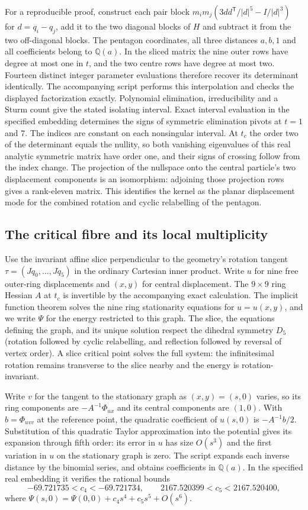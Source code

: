 \documentclass[11pt]{article}
\begin{document}
For a reproducible proof, construct each pair block
$m_im_j(3dd^{\mathsf T}/|d|^5-I/|d|^3)$ for $d=q_i-q_j$, add it to
the two diagonal blocks of $H$ and subtract it from the two off-diagonal
blocks. The pentagon coordinates, all three distances $a,b,1$ and all
coefficients belong to $\mathbb Q(a)$. In the sliced matrix the nine outer
rows have degree at most one in $t$, and the two centre rows have degree
at most two. Fourteen distinct integer parameter evaluations therefore
recover its determinant identically. The accompanying script performs
this interpolation and checks the displayed factorization exactly.
Polynomial elimination, irreducibility and a Sturm count give the stated
isolating interval. Exact interval evaluation in the specified embedding
determines the signs of symmetric elimination pivots at $t=1$ and $7$.
The indices are constant on each nonsingular interval. At $t_c$ the
order two of the determinant equals the nullity, so both vanishing
eigenvalues of this real analytic symmetric matrix have order one,
and their signs of crossing follow from the index change. The projection
of the nullspace onto the central particle's two displacement components
is an isomorphism: adjoining those projection rows gives a rank-eleven
matrix. This identifies the kernel as the planar displacement mode for
the combined rotation and cyclic relabelling of the pentagon.


\subsection{The critical fibre and its local multiplicity}
Use the invariant affine slice perpendicular to the geometry's rotation
tangent $\tau=(Jq_0,\ldots,Jq_5)$ in the ordinary Cartesian inner
product. Write $u$ for nine free outer-ring displacements and $(x,y)$
for central displacement. The $9\times9$ ring Hessian $A$ at $t_c$ is
invertible by the accompanying exact calculation. The implicit function
theorem solves the nine ring stationarity equations for $u=u(x,y)$,
and we write $\Psi$ for the energy restricted to this graph. The slice,
the equations defining the graph, and its unique solution respect the
dihedral symmetry $D_5$ (rotation followed by cyclic relabelling, and
reflection followed by reversal of vertex order). A slice critical
point solves the full system: the infinitesimal rotation remains
transverse to the slice nearby and the energy is rotation-invariant.

Write $v$ for the tangent to the stationary graph as $(x,y)=(s,0)$ varies,
so its ring components are $-A^{-1}\Phi_{ux}$ and its central components
are $(1,0)$. With $b=\Phi_{u v v}$ at the reference point, the quadratic
coefficient of $u(s,0)$ is $-A^{-1}b/2$. Substitution of this quadratic
Taylor approximation into the potential gives its expansion through fifth
order: its error in $u$ has size $O(s^3)$ and the first variation in $u$
on the stationary graph is zero. The script expands each inverse
distance by the binomial series, and obtains coefficients in $\mathbb Q(a)$.
In the specified real embedding it verifies the rational bounds
\[
 -69.721735<c_4<-69.721734,\qquad 2167.520399<c_5<2167.520400,
\]
where $\Psi(s,0)=\Psi(0,0)+c_4s^4+c_5s^5+O(s^6)$.
\end{document}
